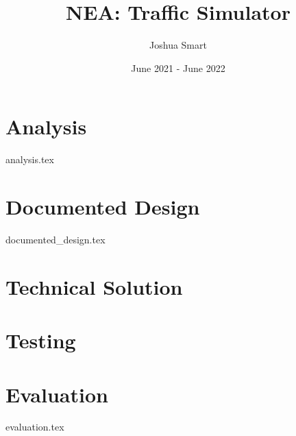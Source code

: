 \documentclass{report}
\title{NEA: Traffic Simulator}
\author{Joshua Smart}
\date{June 2021 - June 2022}
\begin{document}
    \begin{titlepage}
        \maketitle
    \end{titlepage}

    \tableofcontents

    \setparagraphstyling
    \chapter{Analysis}
        {analysis.tex}

    \chapter{Documented Design}
        {documented_design.tex}

    \chapter{Technical Solution}

    \chapter{Testing}

    \chapter{Evaluation}
        {evaluation.tex}

    \printbibliography
\end{document}
